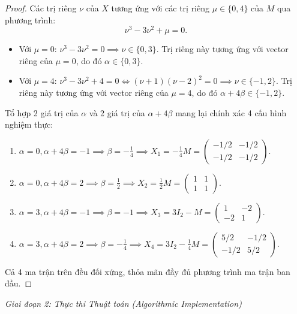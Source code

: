 \documentclass{article}
\begin{document}
\begin{proof}
	Các trị riêng $\nu$ của $X$ tương ứng với các trị riêng $\mu \in \{0, 4\}$ của $M$ qua phương trình:
	\begin{equation*}
		\nu^3 - 3\nu^2 + \mu = 0.
	\end{equation*}
	\begin{itemize}
		\item Với $\mu = 0$: $\nu^3 - 3\nu^2 = 0 \implies \nu \in \{0, 3\}$. Trị riêng này tương ứng với vector riêng của $\mu = 0$, do đó $\alpha \in \{0, 3\}$.
		\item Với $\mu = 4$: $\nu^3 - 3\nu^2 + 4 = 0 \iff (\nu + 1)(\nu - 2)^2 = 0 \implies \nu \in \{-1, 2\}$. Trị riêng này tương ứng với vector riêng của $\mu = 4$, do đó $\alpha + 4\beta \in \{-1, 2\}$.
	\end{itemize}
	Tổ hợp 2 giá trị của $\alpha$ và 2 giá trị của $\alpha + 4\beta$ mang lại chính xác 4 cấu hình nghiệm thực:
	\begin{enumerate}
		\item $\alpha = 0, \alpha + 4\beta = -1 \implies \beta = -\frac{1}{4} \implies X_1 = -\frac{1}{4}M = \begin{pmatrix} -1/2 & -1/2 \\ -1/2 & -1/2 \end{pmatrix}$.
		\item $\alpha = 0, \alpha + 4\beta = 2 \implies \beta = \frac{1}{2} \implies X_2 = \frac{1}{2}M = \begin{pmatrix} 1 & 1 \\ 1 & 1 \end{pmatrix}$.
		\item $\alpha = 3, \alpha + 4\beta = -1 \implies \beta = -1 \implies X_3 = 3I_2 - M = \begin{pmatrix} 1 & -2 \\ -2 & 1 \end{pmatrix}$.
		\item $\alpha = 3, \alpha + 4\beta = 2 \implies \beta = -\frac{1}{4} \implies X_4 = 3I_2 - \frac{1}{4}M = \begin{pmatrix} 5/2 & -1/2 \\ -1/2 & 5/2 \end{pmatrix}$.
	\end{enumerate}
	Cả 4 ma trận trên đều đối xứng, thỏa mãn đầy đủ phương trình ma trận ban đầu.
\end{proof}

\vspace{0.5em}\noindent\emph{Giai đoạn 2: Thực thi Thuật toán (Algorithmic Implementation)}
\end{document}
